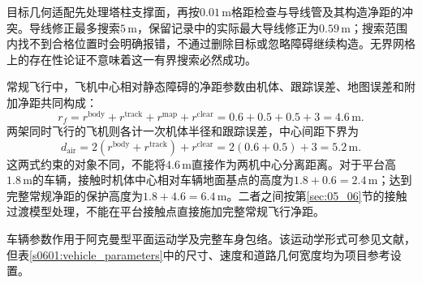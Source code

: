 目标几何适配先处理塔柱支撑面，再按$0.01\,\mathrm m$格距检查与导线管及其构造净距的冲突。导线修正最多搜索$5\,\mathrm m$，保留记录中的实际最大导线修正为$0.59\,\mathrm m$；搜索范围内找不到合格位置时会明确报错，不通过删除目标或忽略障碍继续构造。无界网格上的存在性论证不意味着这一有界搜索必然成功。

常规飞行中，飞机中心相对静态障碍的净距参数由机体、跟踪误差、地图误差和附加净距共同构成：
\begin{equation}
 r_f=r^{\mathrm{body}}+r^{\mathrm{track}}+r^{\mathrm{map}}+r^{\mathrm{clear}}
 =0.6+0.5+0.5+3=4.6\,\mathrm m.
 \label{s0601:clearance_arithmetic}
\end{equation}
两架同时飞行的飞机则各计一次机体半径和跟踪误差，中心间距下界为
\begin{equation}
 d_{\mathrm{air}}=2(r^{\mathrm{body}}+r^{\mathrm{track}})+r^{\mathrm{clear}}
 =2(0.6+0.5)+3=5.2\,\mathrm m.
 \label{s0601:separation_arithmetic}
\end{equation}
这两式约束的对象不同，不能将$4.6\,\mathrm m$直接作为两机中心分离距离。对于平台高$1.8\,\mathrm m$的车辆，接触时机体中心相对车辆地面基点的高度为$1.8+0.6=2.4\,\mathrm m$；达到完整常规净距的保护高度为$1.8+4.6=6.4\,\mathrm m$。二者之间按第\ref{sec:05_06}节的接触过渡模型处理，不能在平台接触点直接施加完整常规飞行净距。

车辆参数作用于阿克曼型平面运动学及完整车身包络。该运动学形式可参见文献\cite{LaValle2006}，但表\ref{s0601:vehicle_parameters}中的尺寸、速度和道路几何宽度均为项目参考设置。

